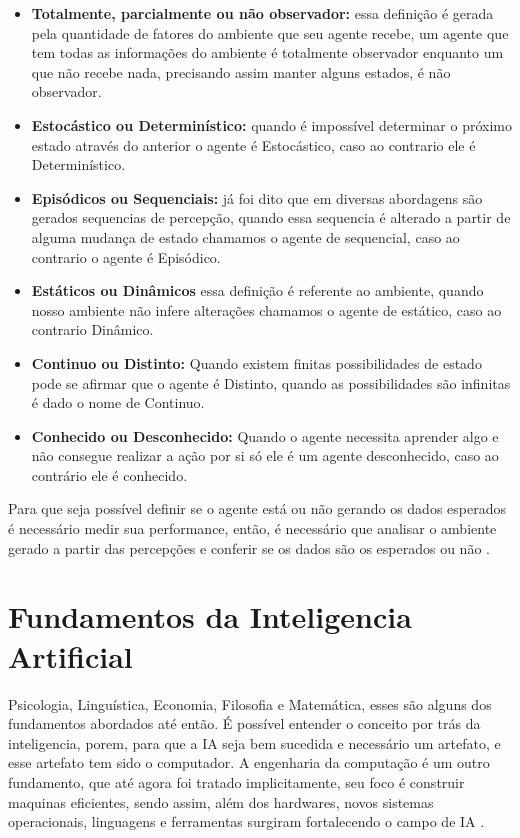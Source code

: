\begin{itemize}
 \item \textbf{Totalmente, parcialmente ou não observador:} essa definição é gerada pela quantidade de fatores do ambiente que seu agente recebe, um agente que tem todas as informações do ambiente é totalmente observador enquanto um que não recebe nada, precisando assim manter alguns estados, é não observador.
 \item \textbf{Estocástico ou Determinístico:} quando é impossível determinar o próximo estado através do anterior o agente é Estocástico, caso ao contrario ele é Determinístico.
 \item \textbf{Episódicos ou Sequenciais:} já foi dito que em diversas abordagens são gerados sequencias de percepção, quando essa sequencia é alterado a partir de alguma mudança de estado chamamos o agente de sequencial, caso ao contrario o agente é Episódico.
 \item \textbf{Estáticos ou Dinâmicos} essa definição é referente ao ambiente, quando nosso ambiente não infere alterações chamamos o agente de estático, caso ao contrario Dinâmico.
 \item \textbf{Continuo ou Distinto:} Quando existem finitas possibilidades de estado pode se afirmar que o agente é Distinto, quando as possibilidades são infinitas é dado o nome de Continuo.
 \item \textbf{Conhecido ou Desconhecido:} Quando o agente necessita aprender algo e não consegue realizar a ação por si só ele é um agente desconhecido, caso ao contrário ele é conhecido.
\end{itemize}

Para que seja possível definir se o agente está ou não gerando os dados esperados é necessário medir sua performance, então, é necessário que analisar o ambiente gerado a partir das percepções e conferir se os dados são os esperados ou não \cite[294-295]{frege1956thought}.

\section{Fundamentos da Inteligencia Artificial}

Psicologia, Linguística, Economia, Filosofia e Matemática, esses são alguns dos fundamentos abordados até então. É possível entender o conceito por trás da inteligencia, porem, para que a IA seja bem sucedida e necessário um artefato, e esse artefato tem sido o computador. A engenharia da computação é um outro fundamento, que até agora foi tratado implicitamente, seu foco é construir maquinas eficientes, sendo assim, além dos hardwares, novos sistemas operacionais, linguagens e ferramentas surgiram fortalecendo o campo de IA \cite[13-14]{russell2003artificial}.

